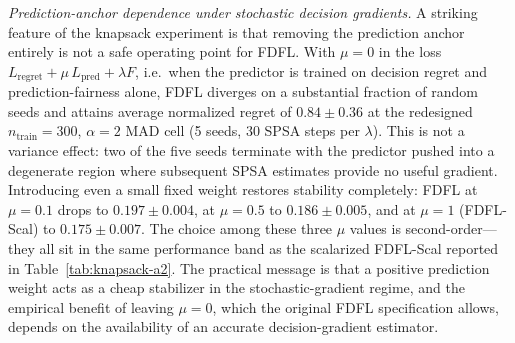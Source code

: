 
\textit{Prediction-anchor dependence under stochastic decision gradients.}
A striking feature of the knapsack experiment is that removing the
prediction anchor entirely is not a safe operating point for FDFL. With
$\mu = 0$ in the loss $L_{\mathrm{regret}} + \mu\,L_{\mathrm{pred}} +
\lambda F$, i.e.\ when the predictor is trained on decision regret and
prediction-fairness alone, FDFL diverges on a substantial fraction of
random seeds and attains average normalized regret of $0.84 \pm 0.36$
at the redesigned $n_{\mathrm{train}} = 300$, $\alpha = 2$ MAD cell
(5 seeds, 30 SPSA steps per $\lambda$). This is not a variance effect:
two of the five seeds terminate with the predictor pushed into a
degenerate region where subsequent SPSA estimates provide no useful
gradient. Introducing even a small fixed weight restores stability
completely: FDFL at $\mu = 0.1$ drops to $0.197 \pm 0.004$, at
$\mu = 0.5$ to $0.186 \pm 0.005$, and at $\mu = 1$ (FDFL-Scal) to
$0.175 \pm 0.007$. The choice among these three $\mu$ values is
second-order---they all sit in the same performance band as the
scalarized FDFL-Scal reported in Table~\ref{tab:knapsack-a2}. The
practical message is that a positive prediction weight acts as a cheap
stabilizer in the stochastic-gradient regime, and the empirical
benefit of leaving $\mu = 0$, which the original FDFL specification
allows, depends on the availability of an accurate decision-gradient
estimator.

